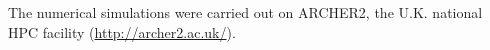 \documentclass[draft]{agujournal2019}
\begin{document}
The numerical simulations were carried out on ARCHER2, the U.K. national HPC facility (\url{http://archer2.ac.uk/}).




%
%





%
%
%
%
%
\end{document}
